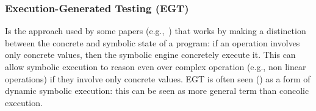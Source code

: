 \subsubsection{Execution-Generated Testing (EGT)} 
Is the approach used by some papers (e.g.,~\cite{KLEE-OSDI08,EXE-CCS06}) that works by making a distinction between the concrete and symbolic state of a program: if an operation involves only concrete values, then the symbolic engine concretely execute it. This can allow symbolic execution to reason even over complex operation (e.g., non linear operations) if they involve only concrete values. EGT is often seen (\cite{CS-CACM13}) as a form of dynamic symbolic execution: this can be seen as more general term than concolic execution.